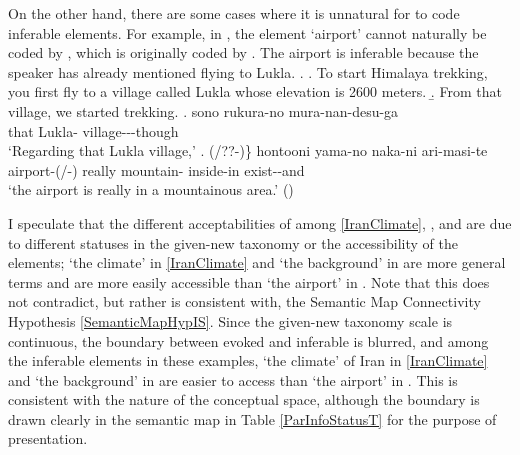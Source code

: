 On the other hand,
there are some cases where it is unnatural for  to code inferable elements.
For example, in \Next[c],
the element  `airport' cannot naturally be coded by ,
which is originally coded by .
The airport is inferable because the speaker has already mentioned flying to Lukla.
\ex.
%
	\a. To start Himalaya trekking, you first fly to a village called Lukla whose elevation is 2600 meters.
	\b. From that village, we started trekking.
	\bg. sono rukura-no mura-nan-desu-ga \\
		that Lukla- village---though \\
		`Regarding that Lukla village,'
	\bg. (/??-)\} hontooni yama-no naka-ni ari-masi-te \\
		airport-(/-) really mountain- inside-in exist--and \\
		`the airport is really in a mountainous area.'
	\hfill{()}

I speculate that the different acceptabilities of  among \ref{IranClimate}, \LLast, and \Last are due to different statuses in the given-new taxonomy or the accessibility of the elements;
`the climate' in \ref{IranClimate} and `the background' in \LLast are more general terms and are more easily accessible
than `the airport' in \Last.
Note that this does not contradict, but rather is consistent with, the Semantic Map Connectivity Hypothesis \ref{SemanticMapHypIS}.
Since the given-new taxonomy scale is continuous,
the boundary between evoked and inferable is blurred, and
among the inferable elements in these examples,
`the climate' of Iran in \ref{IranClimate} and `the background' in \LLast are easier to access than `the airport' in \Last.
This is consistent with the nature of the conceptual space,
although the boundary is drawn clearly in the semantic map in Table \ref{ParInfoStatusT}
for the purpose of presentation.

